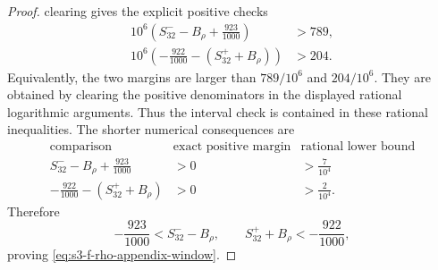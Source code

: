 \documentclass[11pt,a4paper]{amsart}
\theoremstyle{plain}
\theoremstyle{definition}
\theoremstyle{remark}
\begin{document}
\begin{proof}
  clearing gives the explicit positive checks
  \[
  \begin{aligned}
    10^6\left(S_{32}^- -B_\rho +\frac{923}{1000}\right) &> 789,\\
    10^6\left(-\frac{922}{1000}-(S_{32}^+ +B_\rho)\right) &> 204.
  \end{aligned}
  \]
  Equivalently, the two margins are larger than \(789/10^6\) and
  \(204/10^6\). They are obtained by clearing the positive denominators in
  the displayed rational logarithmic arguments.  Thus the interval check is
  contained in these rational inequalities. The shorter numerical
  consequences are
  \[
  \begin{array}{c|c|c}
    \text{comparison} & \text{exact positive margin} &
      \text{rational lower bound}\\
    \hline
    S_{32}^- -B_\rho +\frac{923}{1000} & >0 & >\frac{7}{10^4}\\
    -\frac{922}{1000}-(S_{32}^+ +B_\rho) & >0 & >\frac{2}{10^4}.
  \end{array}
  \]
  Therefore
  \[
    -\frac{923}{1000}<S_{32}^- -B_\rho,
    \qquad
    S_{32}^+ +B_\rho<-\frac{922}{1000},
  \]
  proving \eqref{eq:s3-f-rho-appendix-window}.
\end{proof}
\end{document}
